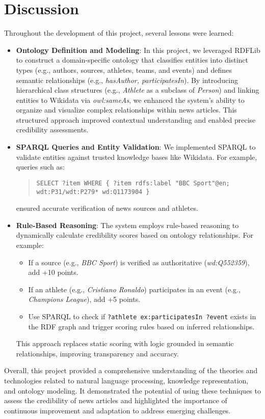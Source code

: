 \documentclass[11pt]{article}
\begin{document}
\section{Discussion}
Throughout the development of this project, several lessons were learned:
\begin{itemize}
    \item \textbf{Ontology Definition and Modeling}: In this project, we leveraged RDFLib to construct a domain-specific ontology that classifies entities into distinct types (e.g., authors, sources, athletes, teams, and events) and defines semantic relationships (e.g., \textit{hasAuthor, participatesIn}). By introducing hierarchical class structures (e.g., \textit{Athlete} as a subclass of \textit{Person}) and linking entities to Wikidata via \textit{owl:sameAs}, we enhanced the system’s ability to organize and visualize complex relationships within news articles. This structured approach improved contextual understanding and enabled precise credibility assessments.
    \item \textbf{SPARQL Queries and Entity Validation}: We implemented SPARQL to validate entities against trusted knowledge bases like Wikidata. For example, queries such as:
    \begin{quote}
    \texttt{SELECT ?item WHERE \{ ?item rdfs:label "BBC Sport"@en; wdt:P31/wdt:P279* wd:Q1173904 \}}
    \end{quote}
    ensured accurate verification of news sources and athletes. 
    \item \textbf{Rule-Based Reasoning}: The system employs rule-based reasoning to dynamically calculate credibility scores based on ontology relationships. For example:
    \begin{itemize}
        \item If a source (e.g., \textit{BBC Sport}) is verified as authoritative (\textit{wd:Q552359}), add +10 points.
        \item If an athlete (e.g., \textit{Cristiano Ronaldo}) participates in an event (e.g., \textit{Champions League}), add +5 points.
        \item Use SPARQL to check if \texttt{?athlete ex:participatesIn ?event} exists in the RDF graph and trigger scoring rules based on inferred relationships.
    \end{itemize}
    This approach replaces static scoring with logic grounded in semantic relationships, improving transparency and accuracy.
\end{itemize}

Overall, this project provided a comprehensive understanding of the theories and technologies related to natural language processing, knowledge representation, and ontology modeling. It demonstrated the potential of using these techniques to assess the credibility of news articles and highlighted the importance of continuous improvement and adaptation to address emerging challenges.

\end{document}
